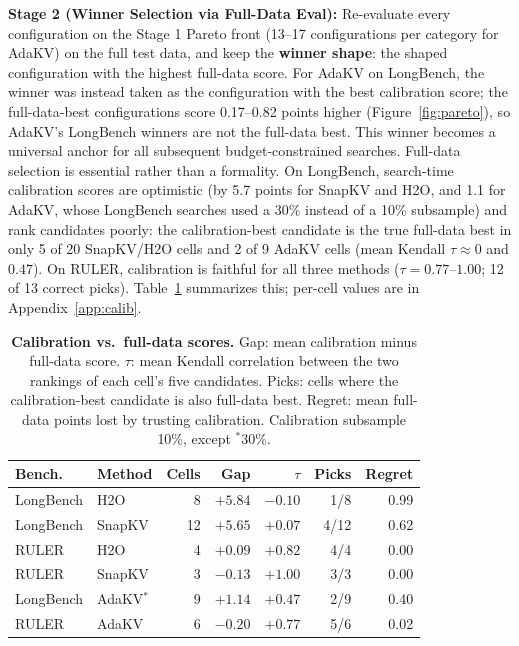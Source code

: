 \documentclass[11pt]{article}
\begin{document}
\textbf{Stage 2 (Winner Selection via Full-Data Eval):} Re-evaluate every configuration on the Stage 1 Pareto front (13--17 configurations per category for AdaKV) on the full test data, and keep the \textbf{winner shape}: the shaped configuration with the highest full-data score. For AdaKV on LongBench, the winner was instead taken as the configuration with the best calibration score; the full-data-best configurations score 0.17--0.82 points higher (Figure~\ref{fig:pareto}), so AdaKV's LongBench winners are not the full-data best. This winner becomes a universal anchor for all subsequent budget-constrained searches. Full-data selection is essential rather than a formality. On LongBench, search-time calibration scores are optimistic (by 5.7 points for SnapKV and H2O, and 1.1 for AdaKV, whose LongBench searches used a 30\% instead of a 10\% subsample) and rank candidates poorly: the calibration-best candidate is the true full-data best in only 5 of 20 SnapKV/H2O cells and 2 of 9 AdaKV cells (mean Kendall $\tau \approx 0$ and $0.47$). On RULER, calibration is faithful for all three methods ($\tau = 0.77$--$1.00$; 12 of 13 correct picks). Table~\ref{tab:calib} summarizes this; per-cell values are in Appendix~\ref{app:calib}.

\begin{table}[htbp]
  \centering
  \footnotesize
  \setlength{\tabcolsep}{2.5pt}
  \begin{tabular}{@{} l l r r r r r @{}}
    \toprule
    \textbf{Bench.} & \textbf{Method} & \textbf{Cells} & \textbf{Gap} & \textbf{$\tau$} & \textbf{Picks} & \textbf{Regret} \\
    \midrule
    \rowcolor{gray!10}
    LongBench & H2O    & 8  & $+5.84$ & $-0.10$ & 1/8  & 0.99 \\
    LongBench & SnapKV & 12 & $+5.65$ & $+0.07$ & 4/12 & 0.62 \\
    \rowcolor{gray!10}
    RULER     & H2O    & 4  & $+0.09$ & $+0.82$ & 4/4  & 0.00 \\
    RULER     & SnapKV & 3  & $-0.13$ & $+1.00$ & 3/3  & 0.00 \\
    \midrule
    \rowcolor{gray!10}
    LongBench & AdaKV$^\ast$ & 9 & $+1.14$ & $+0.47$ & 2/9 & 0.40 \\
    RULER     & AdaKV  & 6  & $-0.20$ & $+0.77$ & 5/6  & 0.02 \\
    \bottomrule
  \end{tabular}
  \caption{\textbf{Calibration vs.\ full-data scores.} Gap: mean calibration minus full-data score. $\tau$: mean Kendall correlation between the two rankings of each cell's five candidates. Picks: cells where the calibration-best candidate is also full-data best. Regret: mean full-data points lost by trusting calibration. Calibration subsample 10\%, except $^\ast$30\%.}
  \label{tab:calib}
\end{table}
\end{document}
